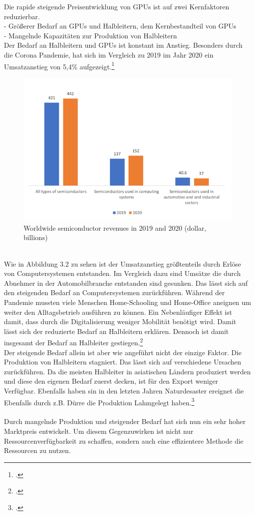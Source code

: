 \documentclass[12pt,toc=bib,toc=listof]{scrreprt}
\begin{document}
Die rapide steigende Preisentwicklung von GPUs ist auf zwei Kernfaktoren reduzierbar.\\
- Größerer Bedarf an GPUs und Halbleitern, dem Kernbestandteil von GPUs\\ %
- Mangelnde Kapazitäten zur Produktion von Halbleitern\\
Der Bedarf an Halbleitern und GPUs ist konstant im Anstieg. Besonders durch die Corona Pandemie,
hat sich im Vergleich zu 2019 im Jahr 2020 ein Umsatzanstieg von 5,4\% aufgezeigt.\footcite [Vgl.] []{Voas.2021}
\begin{figure}[h]
  \centering
  \includegraphics[scale=0.75]{Abbildungen/voas1.png} %
  \caption[]{Worldwide semiconductor revenues in 2019 and 2020 (dollar, billions)}
\end{figure}
\\Wie in Abbildung 3.2 zu sehen ist der Umsatzanstieg größtenteils durch Erlöse von Computersystemen entstanden.
Im Vergleich dazu sind Umsätze die durch Abnehmer in der Automobilbranche entstanden sind gesunken.
Das lässt sich auf den steigenden Bedarf an Computersystemen zurückführen. Während der Pandemie mussten
viele Menschen Home-Schooling und Home-Office aneignen um weiter den Alltagsbetrieb ausführen zu können.
Ein Nebenläufiger Effekt ist damit, dass durch die Digitalisierung weniger Mobilität benötigt wird.
Damit lässt sich der reduzierte Bedarf an Halbleitern erklären. Dennoch ist damit insgesamt der Bedarf an 
Halbleiter gestiegen.\footcite [Vgl.] []{Voas.2021}
\\ Der steigende Bedarf allein ist aber wie angeführt nicht der einzige Faktor. Die Produktion 
von Halbleitern stagniert. Das lässt sich auf verschiedene Ursachen zurückführen. Da die meisten 
Halbleiter in asiatischen Ländern produziert werden und diese den eigenen Bedarf zuerst decken, ist 
für den Export weniger Verfügbar. Ebenfalls haben sin in den letzten Jahren Naturdesaster ereignet die
Ebenfalls durch z.B. Dürre die Produktion Lahmgelegt haben.\footcite [Vgl.] []{Voas.2021}\\\\
Durch mangelnde Produktion und steigender Bedarf hat sich nun ein sehr hoher Marktpreis entwickelt. 
Um diesem Gegenzuwirken ist nicht nur Ressourcenverfügbarkeit zu schaffen, sondern auch eine effizientere Methode
die Ressourcen zu nutzen.
\end{document}
